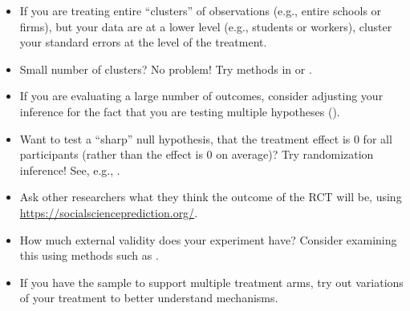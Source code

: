 
\begin{itemize}
    \item If you are treating entire ``clusters'' of observations (e.g., entire schools or firms), but your data are at a lower level (e.g., students or workers), cluster your standard errors at the level of the treatment.
    \item Small number of clusters? No problem! Try methods in \cite{Cameron} or \cite{hagemann}.
    \item If you are evaluating a large number of outcomes, consider adjusting your inference for the fact that you are testing multiple hypotheses (\cite{Anderson}).
    \item Want to test a ``sharp'' null hypothesis, that the treatment effect is 0 for all participants (rather than the effect is 0 on average)? Try randomization inference! See, e.g., \cite{young}.
\end{itemize}




\begin{itemize}
\item Ask other researchers what they think the outcome of the RCT will be, using \url{https://socialscienceprediction.org/}. 
\item How much external validity does your experiment have? Consider examining this using methods such as \cite{kowalski}.
    \end{itemize}






\begin{itemize}
    \item If you have the sample to support multiple treatment arms, try out variations of your treatment to better understand mechanisms.
\end{itemize}




